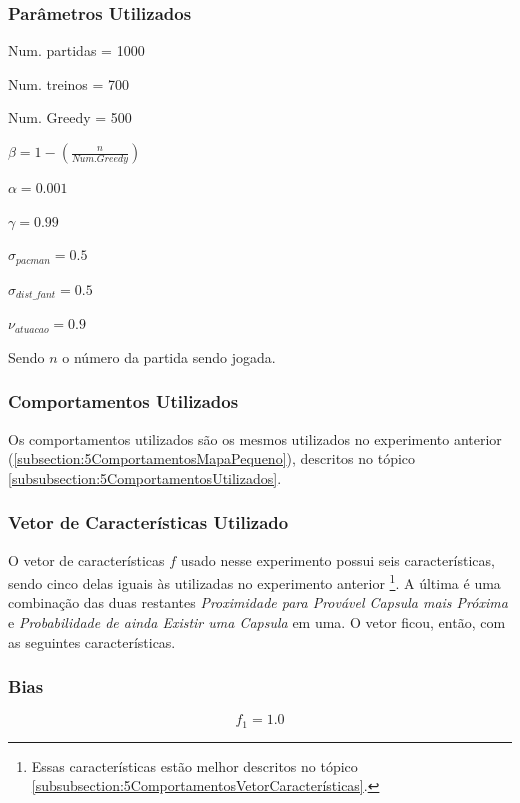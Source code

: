 \subsubsection{Parâmetros Utilizados}

\begin{multicols}{2}

Num. partidas = 1000

Num. treinos = 700

Num. Greedy = 500

$ \beta = 1 - \left( \frac{n}{Num. Greedy} \right) $

$ \alpha = 0.001 $

$ \gamma = 0.99 $

$ \sigma_{pacman} = 0.5 $

$ \sigma_{dist\_fant} = 0.5 $

$ \nu_{atuacao} = 0.9 $

\end{multicols}

Sendo $ n $ o número da partida sendo jogada.


\subsubsection{Comportamentos Utilizados}

Os comportamentos utilizados são os mesmos utilizados no experimento anterior (\ref{subsection:5ComportamentosMapaPequeno}), descritos no tópico \ref{subsubsection:5ComportamentosUtilizados}.

\subsubsection{Vetor de Características Utilizado}

O vetor de características $ f $ usado nesse experimento possui seis características, sendo cinco delas iguais às utilizadas no experimento anterior%
\footnote{Essas características estão melhor descritos no tópico \ref{subsubsection:5ComportamentosVetorCaracterísticas}.%
}. A última é uma combinação das duas restantes \textit{Proximidade para Provável Capsula mais Próxima} e \textit{Probabilidade de ainda Existir uma Capsula} em uma.  O vetor ficou, então, com as seguintes características.

\subsubsection*{Bias}
$$ f_1 = 1.0 $$

